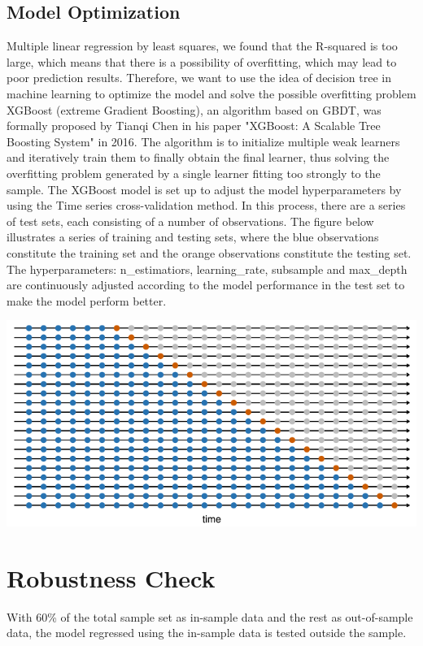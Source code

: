 \documentclass[12pt]{article}
\begin{document}
\subsection{Model Optimization}
Multiple linear regression by least squares, we found that the R-squared is too large, which means that there is a possibility of overfitting, which may lead to poor prediction results. Therefore, we want to use the idea of decision tree in machine learning to optimize the model and solve the possible overfitting problem
XGBoost (extreme Gradient Boosting), an algorithm based on GBDT, was formally proposed by Tianqi Chen in his paper "XGBoost: A Scalable Tree Boosting System" in 2016\cite{chen2016xgboost}. The algorithm is to initialize multiple weak learners and iteratively train them to finally obtain the final learner, thus solving the overfitting problem generated by a single learner fitting too strongly to the sample.
The XGBoost model is set up to adjust the model hyperparameters by using the Time series cross-validation method. In this process, there are a series of test sets, each consisting of a number of observations. The figure below illustrates a series of training and testing sets, where the blue observations constitute the training set and the orange observations constitute the testing set. The hyperparameters: n\_estimatiors, learning\_rate, subsample and max\_depth are continuously adjusted according to the model performance in the test set to make the model perform better.

\centerline{\includegraphics[scale=0.9]{Figure2.png}}

\section{Robustness Check}
With 60\% of the total sample set as in-sample data and the rest as out-of-sample data, the model regressed using the in-sample data is tested outside the sample.
\end{document}
